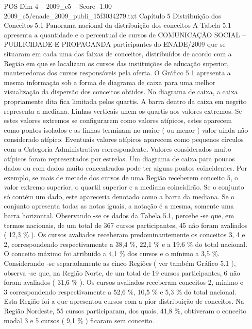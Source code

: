\begin{textsample}{POS Dim 4 – 2009\_c5 – Score -1.00 – 2009\_c5/enade\_2009\_publi\_15f3034279.txt}  \label{ex:f4_pos_266}
Capítulo 5 Distribuição dos Conceitos 5.1 Panorama nacional da distribuição dos conceitos A Tabela 5.1 apresenta a quantidade e o percentual de cursos de COMUNICAÇÃO SOCIAL – PUBLICIDADE E PROPAGANDA participantes do ENADE/2009 que se situaram em cada uma das faixas de conceitos, distribuídos de acordo com a Região em que se localizam os cursos das instituições de educação superior, mantenedoras dos cursos responsáveis pela oferta.
O Gráfico 5.1 apresenta a mesma informação sob a forma de diagrama de caixa para uma melhor visualização da dispersão dos conceitos obtidos.
No diagrama de caixa, a caixa propriamente dita fica limitada pelos quartis.
A barra dentro da caixa em negrito representa a mediana.
Linhas verticais unem os quartis aos valores extremos.
Se estes valores extremos se configurarem como valores atípicos, estes aparecem como pontos isolados e as linhas terminam no maior ( ou menor ) valor ainda não considerado atípico.
Eventuais valores atípicos aparecem como pequenos círculos com a Categoria Administrativa correspondente.
Valores considerados muito atípicos foram representados por estrelas.
Um diagrama de caixa para poucos dados ou com dados muito concentrados pode ter alguns pontos coincidentes.
Por exemplo, se mais de metade dos cursos de uma Região receberem conceito 5, o valor extremo superior, o quartil superior e a mediana coincidirão.
Se o conjunto só contém um dado, este apareceria denotado como a barra da mediana.
Se o conjunto apresenta todas as notas iguais, a notação é a mesma, somente uma barra horizontal.
Observando -se os dados da Tabela 5.1, percebe -se que, em termos nacionais, de um total de 367 cursos participantes, 45 não foram avaliados ( 12,3 \% ).
Os cursos avaliados receberam predominantemente os conceitos 3, 4 e 2, correspondendo respectivamente a 38,4 \%, 22,1 \% e a 19,6 \% do total nacional.
O conceito máximo foi atribuído a 4,1 \% dos cursos e o mínimo a 3,5 \%.
Considerando -se separadamente as cinco Regiões ( ver também Gráfico 5.1 ), observa -se que, na Região Norte, de um total de 19 cursos participantes, 6 não foram avaliados ( 31,6 \% ).
Os cursos avaliados receberam conceitos 2, mínimo e 3 correspondendo respectivamente a 52,6 \%, 10,5 \% e 5,3 \% do total nacional.
Esta Região foi a que apresentou cursos com a pior distribuição de conceitos.
Na Região Nordeste, 55 cursos participaram, dos quais, 41,8 \%, obtiveram o conceito modal 3 e 5 cursos ( 9,1 \% ) ficaram sem conceito.

\end{textsample}
